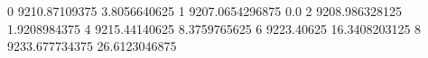 0 9210.87109375 3.8056640625
1 9207.0654296875 0.0
2 9208.986328125 1.9208984375
4 9215.44140625 8.3759765625
6 9223.40625 16.3408203125
8 9233.677734375 26.6123046875
